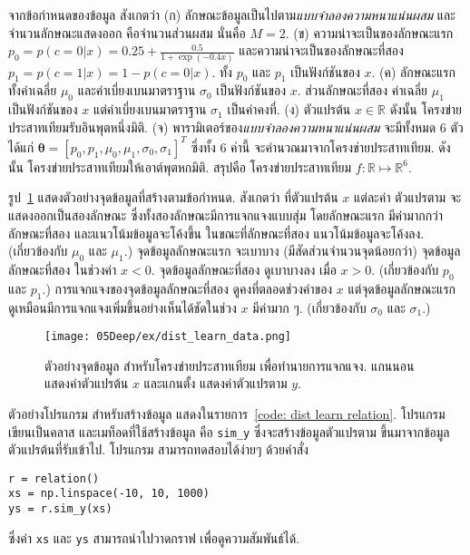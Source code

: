 \begin{Exercise}
จากข้อกำหนดของข้อมูล
สังเกตว่า
(ก) ลักษณะข้อมูลเป็นไปตาม\textit{แบบจำลองความหนาแน่นผสม}
และจำนวนลักษณะแสดงออก คือจำนวนส่วนผสม นั่นคือ $M = 2$.
(ข) ความน่าจะเป็นของลักษณะแรก $p_0 = p(c=0|x) = 0.25+ \frac{0.5}{1 + \exp(-0.4 x)}$
และความน่าจะเป็นของลักษณะที่สอง $p_1 = p(c=1|x) = 1 - p(c=0|x)$.
ทั้ง $p_0$ และ $p_1$ เป็นฟังก์ชันของ $x$.
(ค) ลักษณะแรก ทั้งค่าเฉลี่ย $\mu_0$ และค่าเบี่ยงเบนมาตราฐาน $\sigma_0$ เป็นฟังก์ชันของ $x$.
ส่วนลักษณะที่สอง ค่าเฉลี่ย $\mu_1$ เป็นฟังก์ชันของ $x$ แต่ค่าเบี่ยงเบนมาตราฐาน $\sigma_1$ เป็นค่าคงที่.
(ง) ตัวแปรต้น $x \in \mathbb{R}$ ดังนั้น โครงข่ายประสาทเทียมรับอินพุตหนึ่งมิติ.
(จ) พารามิเตอร์ของ\textit{แบบจำลองความหนาแน่นผสม} จะมีทั้งหมด $6$ ตัว 
ได้แก่ $\bm{\theta} = [p_0, p_1, \mu_0, \mu_1, \sigma_0, \sigma_1]^T$
ซึ่งทั้ง $6$ ค่านี้ จะคำนวณมาจากโครงข่ายประสาทเทียม.
ดังนั้น โครงข่ายประสาทเทียมให้เอาต์พุตหกมิติ.
สรุปคือ โครงข่ายประสาทเทียม $f: \mathbb{R} \mapsto \mathbb{R}^6$.

รูป~\ref{fig: dist learn ann data}
แสดงตัวอย่างจุดข้อมูลที่สร้างตามข้อกำหนด.
สังเกตว่า ที่ตัวแปรต้น $x$ แต่ละค่า 
ตัวแปรตาม จะแสดงออกเป็นสองลักษณะ 
ซึ่งทั้งสองลักษณะมีการแจกแจงแบบสุ่ม
โดยลักษณะแรก มีค่ามากกว่าลักษณะที่สอง และแนวโน้มข้อมูลจะโค้งขึ้น 
ในขณะที่ลักษณะที่สอง แนวโน้มข้อมูลจะโค้งลง.
(เกี่ยวข้องกับ $\mu_0$ และ $\mu_1$.)
จุดข้อมูลลักษณะแรก จะเบาบาง (มีสัดส่วนจำนวนจุดน้อยกว่า)
จุดข้อมูลลักษณะที่สอง ในช่วงค่า $x < 0$.
จุดข้อมูลลักษณะที่สอง ดูเบาบางลง เมื่อ $x > 0$.
(เกี่ยวข้องกับ $p_0$ และ $p_1$.)
การแจกแจงของจุดข้อมูลลักษณะที่สอง ดูคงที่ตลอดช่วงค่าของ $x$
แต่จุดข้อมูลลักษณะแรก ดูเหมือนมีการแจกแจงเพิ่มขึ้นอย่างเห็นได้ชัดในช่วง $x$ มีค่ามาก ๆ.
(เกี่ยวข้องกับ $\sigma_0$ และ $\sigma_1$.)

%
\begin{figure}[H]
\begin{center}
\texttt{[image: 05Deep/ex/dist\_learn\_data.png]}
\caption[ตัวอย่างจุดข้อมูล สำหรับโครงข่ายประสาทเทียมเพื่อทำนายการแจกแจง]{
ตัวอย่างจุดข้อมูล สำหรับโครงข่ายประสาทเทียม เพื่อทำนายการแจกแจง.
แกนนอน แสดงค่าตัวแปรต้น $x$
และแกนตั้ง แสดงค่าตัวแปรตาม $y$.
}
\label{fig: dist learn ann data}
\end{center}
\end{figure}

ตัวอย่างโปรแกรม
สำหรับสร้างข้อมูล 
แสดงในรายการ~\ref{code: dist learn relation}.
โปรแกรมเขียนเป็นคลาส และเมท็อดที่ใช้สร้างข้อมูล คือ \verb|sim_y| 
ซึ่งจะสร้างข้อมูลตัวแปรตาม ขึ้นมาจากข้อมูลตัวแปรต้นที่รับเข้าไป.
โปรแกรม สามารถทดสอบได้ง่ายๆ ด้วยคำสั่ง
\begin{Verbatim}[fontsize=\small]
r = relation()
xs = np.linspace(-10, 10, 1000)
ys = r.sim_y(xs)
\end{Verbatim}
ซึ่งค่า \texttt{xs} และ \texttt{ys} สามารถนำไปวาดกราฟ เพื่อดูความสัมพันธ์ได้.


\end{Exercise}
